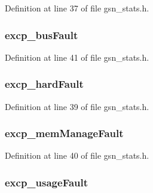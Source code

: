 Definition at line 37 of file gsn\_\-stats.h.

\hypertarget{a00260_abe2cd45ef7d42e875409b0db31b4febb}{
\subsubsection[{excp\_\-busFault}]{ {\bf excp\_\-busFault}}}
\label{a00260_abe2cd45ef7d42e875409b0db31b4febb}


Definition at line 41 of file gsn\_\-stats.h.

\hypertarget{a00260_a1b0106c510c59343efffe347a0af9aea}{
\subsubsection[{excp\_\-hardFault}]{ {\bf excp\_\-hardFault}}}
\label{a00260_a1b0106c510c59343efffe347a0af9aea}


Definition at line 39 of file gsn\_\-stats.h.

\hypertarget{a00260_adbb342849bf2af6c867ea746445f203e}{
\subsubsection[{excp\_\-memManageFault}]{ {\bf excp\_\-memManageFault}}}
\label{a00260_adbb342849bf2af6c867ea746445f203e}


Definition at line 40 of file gsn\_\-stats.h.

\hypertarget{a00260_a0428f166d18bd40f3a8cd5131e116c0b}{
\subsubsection[{excp\_\-usageFault}]{ {\bf excp\_\-usageFault}}}
\label{a00260_a0428f166d18bd40f3a8cd5131e116c0b}


